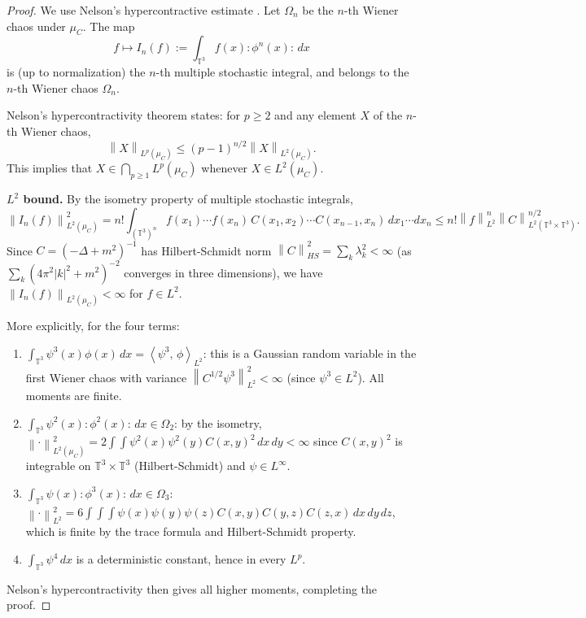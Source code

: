 \documentclass[12pt]{article}
\newcommand{\T}{\mathbb{T}}
\newcommand{\norm}[1]{\left\|#1\right\|}
\newcommand{\ip}[2]{\left\langle #1,\, #2 \right\rangle}
\newcommand{\wick}[1]{:\!#1\!:}
\begin{document}
\begin{proof}
We use Nelson's hypercontractive estimate \cite{NelsonHyper1973}.  Let $\Omega_n$ be the
$n$-th Wiener chaos under $\mu_C$.  The map
\[
  f \mapsto I_n(f) := \int_{\T^3} f(x)\wick{\phi^n(x)}\,dx
\]
is (up to normalization) the $n$-th multiple stochastic integral, and belongs to the $n$-th
Wiener chaos $\Omega_n$.

Nelson's hypercontractivity theorem states: for $p\ge 2$ and any element $X$ of the $n$-th
Wiener chaos,
\[
  \norm{X}_{L^p(\mu_C)} \le (p-1)^{n/2}\norm{X}_{L^2(\mu_C)}.
\]
This implies that $X\in\bigcap_{p\ge 1}L^p(\mu_C)$ whenever $X\in L^2(\mu_C)$.

\textbf{$L^2$ bound.}  By the isometry property of multiple stochastic integrals,
\[
  \norm{I_n(f)}_{L^2(\mu_C)}^2
  = n!\int_{(\T^3)^n}f(x_1)\cdots f(x_n)\,C(x_1,x_2)\cdots C(x_{n-1},x_n)\,dx_1\cdots dx_n
  \le n!\norm{f}_{L^2}^n \norm{C}_{L^2(\T^3\times\T^3)}^{n/2}.
\]
Since $C=(-\Delta+m^2)^{-1}$ has Hilbert-Schmidt norm $\norm{C}_{HS}^2=\sum_k\lambda_k^2<\infty$
(as $\sum_k(4\pi^2|k|^2+m^2)^{-2}$ converges in three dimensions), we have
$\norm{I_n(f)}_{L^2(\mu_C)}<\infty$ for $f\in L^2$.

More explicitly, for the four terms:
\begin{enumerate}
  \item $\int_{\T^3}\psi^3(x)\phi(x)\,dx = \ip{\psi^3}{\phi}_{L^2}$: this is a Gaussian random
        variable in the first Wiener chaos with variance $\norm{C^{1/2}\psi^3}_{L^2}^2<\infty$
        (since $\psi^3\in L^2$).  All moments are finite.
  \item $\int_{\T^3}\psi^2(x)\wick{\phi^2(x)}\,dx\in\Omega_2$: by the isometry,
        $\norm{\cdot}_{L^2(\mu_C)}^2 = 2\int\int\psi^2(x)\psi^2(y)C(x,y)^2\,dx\,dy<\infty$
        since $C(x,y)^2$ is integrable on $\T^3\times\T^3$ (Hilbert-Schmidt) and $\psi\in L^\infty$.
  \item $\int_{\T^3}\psi(x)\wick{\phi^3(x)}\,dx\in\Omega_3$: $\norm{\cdot}_{L^2}^2
        = 6\int\int\int\psi(x)\psi(y)\psi(z)C(x,y)C(y,z)C(z,x)\,dx\,dy\,dz$, which is finite
        by the trace formula and Hilbert-Schmidt property.
  \item $\int_{\T^3}\psi^4\,dx$ is a deterministic constant, hence in every $L^p$.
\end{enumerate}

Nelson's hypercontractivity then gives all higher moments, completing the proof.
\end{proof}
\end{document}
